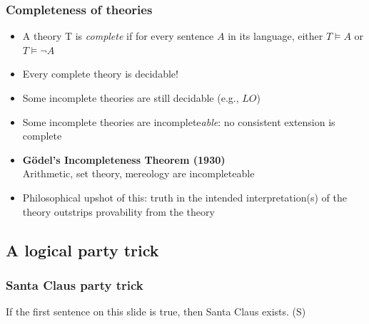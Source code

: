 \begin{frame}
    \frametitle{Completeness of theories}

\begin{itemize}[<+->]
\item A theory T is \emph{complete} if for every sentence $A$ in its language,
either $ T \models A$ or $ T \models \lnot A$
\item Every complete theory is decidable!
\item Some incomplete theories are still decidable (e.g., $LO$)
\item Some incomplete theories are incomplete\emph{able}: no consistent extension is complete
\item \textbf{G\"odel's Incompleteness Theorem (1930)}\\
Arithmetic, set theory, mereology are incompleteable
\item Philosophical upshot of this: truth in the intended
interpretation(s) of the theory outstrips provability from the theory
\end{itemize}
\end{frame}




\subsection{A logical party trick}


\begin{frame}
\frametitle{Santa Claus party trick}
\small
If the first sentence on this slide is true, then Santa Claus exists.
\hfill (S)
\pause
\begin{fitchproof}  
  \open
  \close
\end{fitchproof}
\end{frame}




